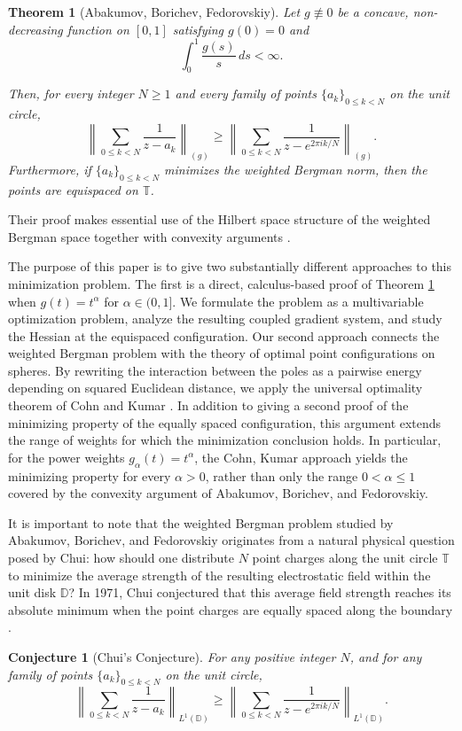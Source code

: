 \documentclass{article}
\newtheorem{theorem}{Theorem}
\newtheorem*{conjecture}{Conjecture}
\begin{document}
\begin{theorem}[Abakumov, Borichev, Fedorovskiy]
\label{ABF Theorem 1}
Let $g\not\equiv 0$ be a concave, non-decreasing function on $[0,1]$
satisfying $g(0)=0$ and
\begin{equation}\label{g condition}
\int_0^1 \frac{g(s)}{s}\,ds<\infty.
\end{equation}

Then, for every integer $N\geq 1$ and every family of points
$\{a_k\}_{0\leq k<N}$ on the unit circle,
\[
\left\|
\sum_{0\leq k<N}
\frac{1}{z-a_k}
\right\|_{(g)}
\geq
\left\|
\sum_{0\leq k<N}
\frac{1}{z-e^{2\pi i k/N}}
\right\|_{(g)}.
\]
Furthermore, if $\{a_k\}_{0\leq k<N}$ minimizes the weighted Bergman norm,
then the points are equispaced on $\mathbb{T}$.
\end{theorem}

Their proof makes essential use of the Hilbert space structure of the weighted Bergman space together with convexity arguments \cite{ABF2021}.

The purpose of this paper is to give two substantially different approaches to this minimization problem. The first is a direct, calculus-based proof of Theorem \ref{ABF Theorem 1} when $g(t)=t^\alpha$ for $\alpha\in (0,1]$. We formulate the problem as a multivariable optimization problem, analyze the resulting coupled gradient system, and study the Hessian at the equispaced configuration. 
Our second approach connects the weighted Bergman problem with the theory of optimal point configurations on spheres. By rewriting the interaction between the poles as a pairwise energy depending on squared Euclidean distance, we apply the universal optimality theorem of Cohn and Kumar \cite{cohnKumar2007}. In addition to giving a second proof of the minimizing property of the equally spaced configuration, this argument extends the range of weights for which the minimization conclusion holds. In particular, for the power weights $g_\alpha(t)=t^\alpha$, the Cohn, Kumar approach yields the minimizing property for every $\alpha>0$, rather than only the range $0<\alpha\leq1$ covered by the convexity argument of Abakumov, Borichev, and Fedorovskiy.

It is important to note that the weighted Bergman problem studied by Abakumov, Borichev, and Fedorovskiy originates from a natural physical question posed by Chui: how should one distribute $N$ point charges along the unit circle $\mathbb{T}$ to minimize the average strength of the resulting electrostatic field within the unit disk $\mathbb{D}$? In 1971, Chui conjectured that this average field strength reaches its absolute minimum when the point charges are equally spaced along the boundary \cite{chui1971}.
\begin{conjecture}[Chui's Conjecture]
For any positive integer $N$, and for any family of points $\{a_k\}_{0\leq k<N}$ on the unit circle,
\[\left\|\sum_{0\leq k<N}\frac{1}{z-a_k}\right\|_{L^1(\mathbb{D})}\geq\left\|\sum_{0\leq k<N}\frac{1}{z-e^{2\pi i k/N}}\right\|_{L^1(\mathbb{D})}.\]
\end{conjecture}
\end{document}
